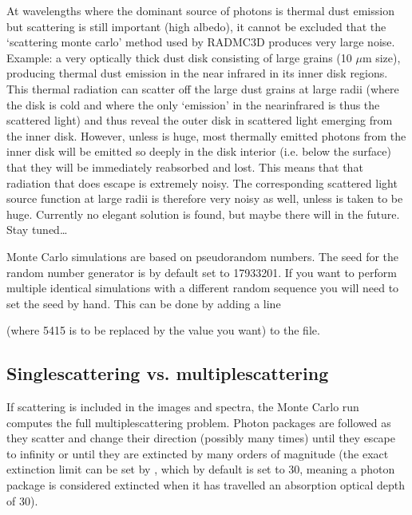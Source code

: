 \documentclass[letterpaper,10pt,english]{sphinxmanual}
\begin{document}
 At wavelengths where the dominant source of photons is thermal dust
emission but scattering is still important (high albedo), it cannot be excluded
that the ‘scattering monte carlo’ method used by RADMC\sphinxhyphen{}3D produces very large
noise. Example: a very optically thick dust disk consisting of large grains (10
\(\mu\)m size), producing thermal dust emission in the near infrared in its
inner disk regions. This thermal radiation can scatter off the large dust grains
at large radii (where the disk is cold and where the only ‘emission’ in the
near\sphinxhyphen{}infrared is thus the scattered light) and thus reveal the outer disk in
scattered light emerging from the inner disk. However, unless  is
huge, most thermally emitted photons from the inner disk will be emitted so
deeply in the disk interior (i.e. below the surface) that they will be
immediately reabsorbed and lost. This means that that radiation that does escape
is extremely noisy. The corresponding scattered light source function at large
radii is therefore very noisy as well, unless  is taken to be
huge. Currently no elegant solution is found, but maybe there will in the
future. Stay tuned…

 Monte Carlo simulations are based on pseudo\sphinxhyphen{}random numbers.
The seed for the random number generator is by default set to \sphinxhyphen{}17933201.
If you want to perform multiple identical simulations with a different
random sequence you will need to set the seed by hand. This can be
done by adding a line

\begin{sphinxVerbatim}[commandchars=\\\{\}]
  
\end{sphinxVerbatim}

(where \sphinxhyphen{}5415 is to be replaced by the value you want) to the  file.


\subsection{Single\sphinxhyphen{}scattering vs. multiple\sphinxhyphen{}scattering}
\label{\detokenize{dustradtrans:single-scattering-vs-multiple-scattering}}\label{\detokenize{dustradtrans:sec-single-multiple-scattering}}
If scattering is included in the images and spectra, the Monte Carlo run
computes the full multiple\sphinxhyphen{}scattering problem. Photon packages are followed as
they scatter and change their direction (possibly many times) until they escape
to infinity or until they are extincted by many orders of magnitude (the exact
extinction limit can be set by , which by default is set to
30, meaning a photon package is considered extincted when it has travelled an
absorption optical depth of 30).
\end{document}
